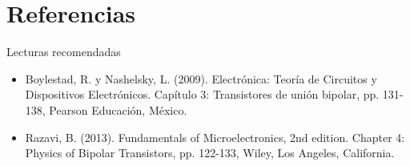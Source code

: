 \documentclass[t,aspectratio=169]{beamer}
\begin{document}
\section{Referencias}
\begin{frame}{Lecturas recomendadas}

\begin{itemize}
    \item Boylestad, R. y Nashelsky, L. (2009). Electrónica: Teoría de Circuitos y Dispositivos Electrónicos. Capítulo 3: Transistores de unión bipolar, pp. 131-138, Pearson Educación, México.
    \item Razavi, B. (2013). Fundamentals of Microelectronics, 2nd edition. Chapter 4: Physics of Bipolar Transistors, pp. 122-133, Wiley, Los Angeles, California.
\end{itemize}
    
\end{frame}
\end{document}
